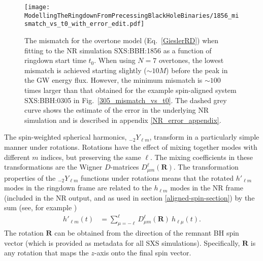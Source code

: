 \begin{figure}[t]
    \centering
    \texttt{[image: ModellingTheRingdownFromPrecessingBlackHoleBinaries/1856\_mismatch\_vs\_t0\_with\_error\_edit.pdf]}
    \caption[Mismatch as a function of ringdown start time for an overtone model fitted to SXS:BBH:1856]{
    The mismatch for the overtone model (Eq.~\ref{GieslerRD}) when fitting to the NR simulation SXS:BBH:1856 as a function of ringdown start time $t_0$. When using $N=7$ overtones, the lowest mismatch is achieved starting slightly ($\sim 10M$) before the peak in the GW energy flux.
    However, the minimum mismatch is $\sim 100$ times larger than that obtained for the example spin-aligned system SXS:BBH:0305 in Fig.~\ref{305_mismatch_vs_t0}. The dashed grey curve shows the estimate of the error in the underlying NR simulation and is described in appendix \ref{NR_error_appendix}.
    }
    \label{1856_mismatch_vs_t0}
\end{figure}

The spin-weighted spherical harmonics, ${}_{-2}Y_{\ell m}$, transform in a particularly simple manner under rotations.
Rotations have the effect of mixing together modes with different $m$ indices, but preserving the same $\ell$. 
The mixing coefficients in these transformations are the Wigner $D$-matrices $D^{\ell}_{\mu m} (\mathbf{R})$.
The transformation properties of the ${}_{-2}Y_{\ell m}$ functions under rotations means that the rotated $h'_{\ell m}$ modes in the ringdown frame are related to the $h_{\ell m}$ modes in the NR frame (included in the NR output, and as used in section \ref{aligned-spin-section}) by the sum (see, for example \cite{rotation, 2011PhRvD..84b4046S, 2011PhRvD..84l4002O})
\begin{align}\label{Yrotation_wignerD}
    h'_{\ell m}(t) &= \sum_{\mu = -\ell}^{\ell} D^{\ell}_{\mu m} (\mathbf{R}) ~ h_{\ell \mu}(t).
\end{align}
The rotation $\mathbf{R}$ can be obtained from the direction of the remnant BH spin vector (which is provided as metadata for all SXS simulations). Specifically, $\mathbf{R}$ is any rotation that maps the $z$-axis onto the final spin vector.

